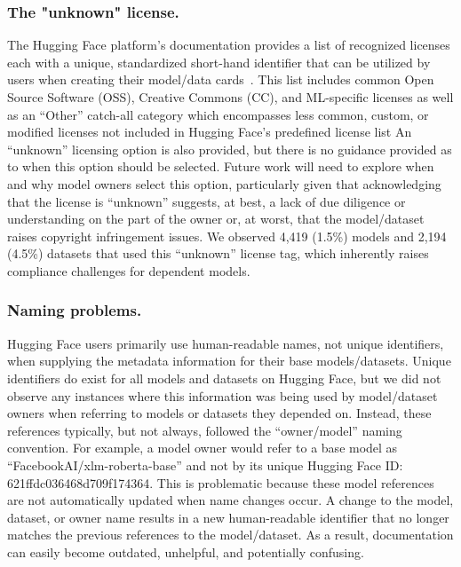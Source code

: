 \subsubsection{The "unknown" license.}
The Hugging Face platform's documentation provides a list of recognized licenses each with a unique, standardized short-hand identifier that can be utilized by users when creating their model/data cards~\cite{hugging_face_licenses}. %
This list includes common Open Source Software (OSS), Creative Commons (CC), and ML-specific licenses as well as an ``Other'' catch-all category which encompasses less common, custom, or modified licenses not included in Hugging Face's predefined license list %
An ``unknown'' licensing option is also provided, but there is no guidance provided as to when this option should be selected. Future work will need to explore when and why model owners select this option, particularly given that acknowledging that the license is ``unknown'' suggests, at best, a lack of due diligence or understanding on the part of the owner or, at worst, that the model/dataset raises copyright infringement issues.  We observed 4,419 (1.5\%) models and 2,194 (4.5\%) datasets that used this ``unknown'' license tag, which inherently raises compliance challenges for dependent models.

\subsubsection{Naming problems.}
\label{sec:naming-problems} 
Hugging Face users primarily use human-readable names, not unique identifiers, when supplying the metadata information for their base models/datasets.  Unique identifiers do exist for all models and datasets on Hugging Face, but we did not observe any instances where this information was being used by model/dataset owners when referring to models or datasets they depended on. Instead, these references typically, but not always, followed the ``owner/model'' naming convention.  For example, a model owner would refer to a base model as ``FacebookAI/xlm-roberta-base'' and not by its unique Hugging Face ID: 621ffdc036468d709f174364. This is problematic because these model references are not automatically updated when name changes occur. A change to the model, dataset, or owner name results in a new human-readable identifier that no longer matches the previous references to the model/dataset.  As a result, documentation can easily become outdated, unhelpful, and potentially confusing.

